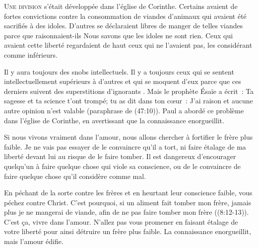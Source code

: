 \lettrine{U}{ne division} s'était développée dans l'église de Corinthe.
 Certains avaient de fortes convictions
 contre la consommation de viandes d'animaux
 qui avaient été sacrifiés à des idoles.
 D'autres se déclaraient libres de manger
 de telles viandes parce que \ocadr raisonnaient-ils \fcadr{}
 \Og Nous savons que les idoles ne sont rien. \Fg{}
 Ceux qui avaient cette liberté regardaient de haut
 ceux qui ne l'avaient pas, les considérant comme inférieurs.

Il y aura toujours des snobs intellectuels.
 Il y a toujours ceux qui se sentent intellectuellement
 supérieurs à d'autres et qui se moquent d'eux
 parce que ces derniers suivent \Og des superstitions d'ignorants \Fg{}.
 Mais le prophète Ésaïe a écrit~: 
 \Og Ta sagesse et ta science t'ont trompé;
 tu as dit dans ton c\oe{}ur~: 
 \Og J'ai raison et aucune autre opinion n'est valable \Fg{}
 (paraphrase de (47:10)).
 Paul a abordé ce problème dans l'église de Corinthe,
 en avertissant que \Og la connaissance enorgueillit. \Fg{}


Si nous vivons vraiment dans l'amour,
 nous allons chercher à fortifier le frère plus faible.
 Je ne vais pas essayer de le convaincre qu'il a tort,
 ni faire étalage de ma liberté devant lui
 au risque de le faire tomber.
 Il est dangereux d'encourager quelqu'un
 à faire quelque chose qui viole sa conscience,
 ou de le convaincre de faire quelque chose
 qu'il considère comme mal.

\Og En péchant de la sorte contre les frères
 et en heurtant leur conscience faible,
 vous péchez contre Christ.
 C'est pourquoi, si un aliment fait tomber mon frère,
 jamais plus je ne mangerai de viande,
 afin de ne pas faire tomber mon frère \Fg{}
 ((8:12-13)).
 C'est \c{c}a, vivre dans l'amour.
 N'allez pas vous promener en faisant étalage
 de votre liberté pour ainsi détruire un frère plus faible.
 La connaissance enorgueillit, mais l'amour édifie.

\dvrule




